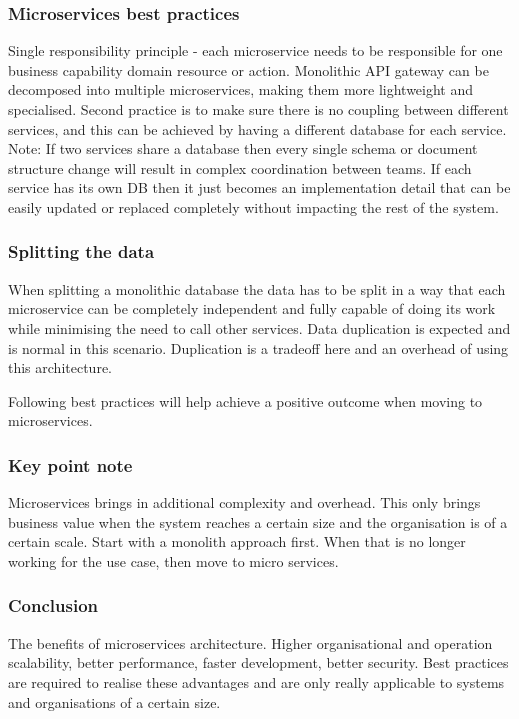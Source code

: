 \documentclass[a4paper, 11pt]{book}
\begin{document}
    \subsubsection{Microservices best practices}
    Single responsibility principle - each microservice needs to be responsible for one business capability domain resource or action.
    Monolithic API gateway can be decomposed into multiple microservices, making them more lightweight and specialised.
    Second practice is to make sure there is no coupling between different services, and this can be achieved by having a different database for each service.
    Note: If two services share a database then every single schema or document structure change will result in complex coordination between teams.
    If each service has its own DB then it just becomes an implementation detail that can be easily updated or replaced completely without impacting the rest of the system.

    \subsubsection{Splitting the data}
    When splitting a monolithic database the data has to be split in a way that each microservice can be completely independent and fully capable of doing its work while minimising the need to call other services.
    Data duplication is expected and is normal in this scenario.
    Duplication is a tradeoff here and an overhead of using this architecture.

    Following best practices will help achieve a positive outcome when moving to microservices.

    \subsubsection{Key point note}
    Microservices brings in additional complexity and overhead.
    This only brings business value when the system reaches a certain size and the organisation is of a certain scale.
    Start with a monolith approach first.
    When that is no longer working for the use case, then move to micro services.

    \subsubsection{Conclusion}

    The benefits of microservices architecture.
    Higher organisational and operation scalability, better performance, faster development, better security.
    Best practices are required to realise these advantages and are only really applicable to systems and organisations of a certain size.
\end{document}

